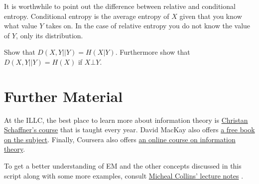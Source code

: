 It is worthwhile to point out the difference between relative and conditional entropy. Conditional entropy is the average entropy of $ X $ given that you
know what value $ Y $ takes on. In the case of relative entropy you do not know the value of $ Y $, only its distribution.

\begin{Exercise}
Show that $ D(X,Y||Y) = H(X|Y) $. Furthermore show that $ D(X,Y||Y) = H(X) $ if $ X\bot Y $.
\end{Exercise}

\section*{Further Material}

At the ILLC, the best place to learn more about information theory is \href{http://homepages.cwi.nl/~schaffne/courses/inftheory/2015/}{Christan Schaffner's
course} that is taught every year. David MacKay also offers \href{http://www.inference.phy.cam.ac.uk/itprnn/book.pdf}{a free book on the subject}. Finally,
Coursera also offers \href{https://www.coursera.org/course/informationtheory}{an online course on information theory}.

To get a better understanding of EM and the other concepts discussed in this script along with some more examples, consult 
\href{http://www.cs.columbia.edu/~mcollins/em.pdf}{Micheal Collins' lecture notes} .





